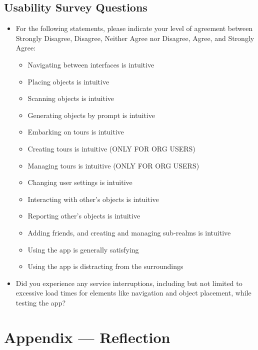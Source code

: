 \documentclass[12pt, titlepage]{article}
\begin{document}
\begin{enumerate}
\subsection{Usability Survey Questions} \label{sub:usability_survey}

\begin{itemize}
    \item For the following statements, please indicate your level of agreement between Strongly Disagree, Disagree, Neither Agree nor Disagree, Agree, and Strongly Agree:
    \begin{itemize}
        \item Navigating between interfaces is intuitive
        \item Placing objects is intuitive
        \item Scanning objects is intuitive
        \item Generating objects by prompt is intuitive
        \item Embarking on tours is intuitive
        \item Creating tours is intuitive (ONLY FOR ORG USERS)
        \item Managing tours is intuitive (ONLY FOR ORG USERS)
        \item Changing user settings is intuitive
        \item Interacting with other's objects is intuitive
        \item Reporting other's objects is intuitive
        \item Adding friends, and creating and managing sub-realms is intuitive
        \item Using the app is generally satisfying
        \item Using the app is distracting from the surroundings
    \end{itemize}
    \item Did you experience any service interruptions, including but not limited to excessive load times for elements like navigation and object placement, while testing the app? \\
\end{itemize}

\newpage{}
\section*{Appendix --- Reflection}



\end{enumerate}
\end{document}
